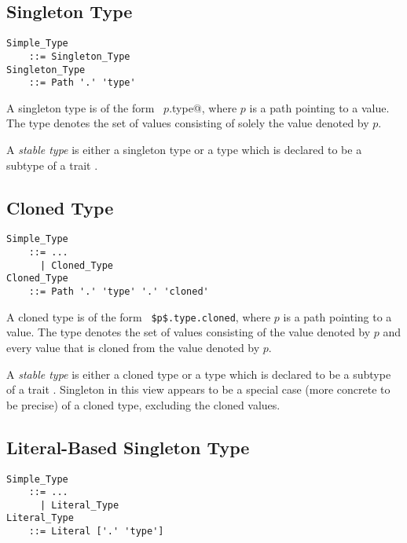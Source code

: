 \subsection{Singleton Type}
\label{sec:singleton-types}

\grammar\begin{lstlisting}
Simple_Type 
    ::= Singleton_Type
Singleton_Type
    ::= Path '.' 'type'
\end{lstlisting}

A singleton type is of the form ~\lstinline@$p$.type@, where $p$ is a path pointing to a value. The type denotes the set of values consisting of solely the value denoted by $p$.

A {\em stable type} is either a singleton type or a type which is declared to be a subtype of a trait . 





\subsection{Cloned Type}
\label{sec:cloned-types}

\grammar\begin{lstlisting}
Simple_Type 
    ::= ...
      | Cloned_Type
Cloned_Type
    ::= Path '.' 'type' '.' 'cloned'
\end{lstlisting}

A cloned type is of the form ~\lstinline!$p$.type.cloned!, where $p$ is a path pointing to a value. The type denotes the set of values consisting of the value denoted by $p$ and every value that is cloned from the value denoted by $p$. 

A {\em stable type} is either a cloned type or a type which is declared to be a subtype of a trait . Singleton in this view appears to be a special case (more concrete to be precise) of a cloned type, excluding the cloned values. 





\subsection{Literal-Based Singleton Type}
\label{sec:literal-based-singleton-type}

\grammar\begin{lstlisting}
Simple_Type 
    ::= ...
      | Literal_Type
Literal_Type
    ::= Literal ['.' 'type']
\end{lstlisting}

